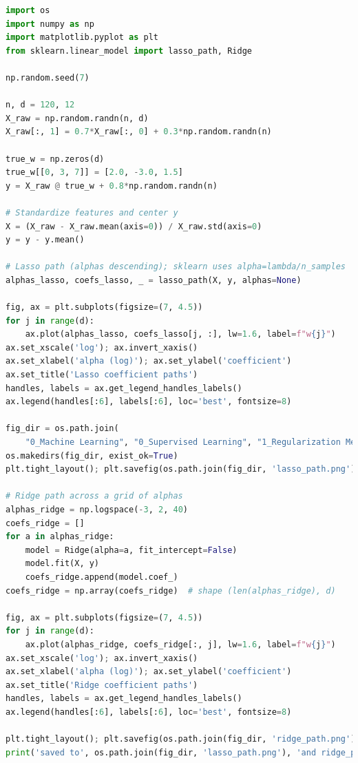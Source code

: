 \documentclass{article}
\begin{document}
\begin{lstlisting}[language=Python,caption={gen_regularization_figures.py}]
import os
import numpy as np
import matplotlib.pyplot as plt
from sklearn.linear_model import lasso_path, Ridge

np.random.seed(7)

n, d = 120, 12
X_raw = np.random.randn(n, d)
X_raw[:, 1] = 0.7*X_raw[:, 0] + 0.3*np.random.randn(n)

true_w = np.zeros(d)
true_w[[0, 3, 7]] = [2.0, -3.0, 1.5]
y = X_raw @ true_w + 0.8*np.random.randn(n)

# Standardize features and center y
X = (X_raw - X_raw.mean(axis=0)) / X_raw.std(axis=0)
y = y - y.mean()

# Lasso path (alphas descending); sklearn uses alpha=lambda/n_samples
alphas_lasso, coefs_lasso, _ = lasso_path(X, y, alphas=None)

fig, ax = plt.subplots(figsize=(7, 4.5))
for j in range(d):
    ax.plot(alphas_lasso, coefs_lasso[j, :], lw=1.6, label=f"w{j}")
ax.set_xscale('log'); ax.invert_xaxis()
ax.set_xlabel('alpha (log)'); ax.set_ylabel('coefficient')
ax.set_title('Lasso coefficient paths')
handles, labels = ax.get_legend_handles_labels()
ax.legend(handles[:6], labels[:6], loc='best', fontsize=8)

fig_dir = os.path.join(
    "0_Machine Learning", "0_Supervised Learning", "1_Regularization Methods in Regression", "figures")
os.makedirs(fig_dir, exist_ok=True)
plt.tight_layout(); plt.savefig(os.path.join(fig_dir, 'lasso_path.png'), dpi=160)

# Ridge path across a grid of alphas
alphas_ridge = np.logspace(-3, 2, 40)
coefs_ridge = []
for a in alphas_ridge:
    model = Ridge(alpha=a, fit_intercept=False)
    model.fit(X, y)
    coefs_ridge.append(model.coef_)
coefs_ridge = np.array(coefs_ridge)  # shape (len(alphas_ridge), d)

fig, ax = plt.subplots(figsize=(7, 4.5))
for j in range(d):
    ax.plot(alphas_ridge, coefs_ridge[:, j], lw=1.6, label=f"w{j}")
ax.set_xscale('log'); ax.invert_xaxis()
ax.set_xlabel('alpha (log)'); ax.set_ylabel('coefficient')
ax.set_title('Ridge coefficient paths')
handles, labels = ax.get_legend_handles_labels()
ax.legend(handles[:6], labels[:6], loc='best', fontsize=8)

plt.tight_layout(); plt.savefig(os.path.join(fig_dir, 'ridge_path.png'), dpi=160)
print('saved to', os.path.join(fig_dir, 'lasso_path.png'), 'and ridge_path.png')
\end{lstlisting}
\end{document}
